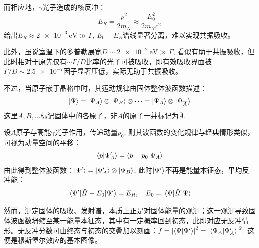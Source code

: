 \documentclass[aps,pre,12pt,preprint,%
	onecolumn,showpacs,showkeys,nofootinbib]{revtex4-1}
\begin{document}
	而相应地，$\gamma$光子造成的核反冲：
	\begin{equation}
		E_R = \frac{p^2}{2m_N} \approx \frac{E_0^2}{2m_N c^2}
	\end{equation}
	给出$E_R \approx \SI{2e-3}{\eV} \gg \Gamma$, $E_0 \pm E_R$谱线显著分离，难以实现共振吸收。
\clearpage
	
	此外，虽说室温下的多普勒展宽$D\sim\SI{2e-2}{\eV} \gg \Gamma$, 看似有助于共振吸收，但此时相对于原先仅有$\sim\Gamma/D$比率的光子可被吸收，即有效吸收界面被$\Gamma/D\sim\num{2.5e-7}$因子显著压低，实际无助于共振吸收。
	
	\newparagraph
	不过，当原子嵌于晶格中时，其运动规律由固体整体波函数描述：
	\begin{equation}
		\ket{\Psi}
		= \ket{\Psi_A} \otimes \ket{\Psi_B}
			\otimes \cdots
		= \ket{\Psi_A} \otimes \ket{\Psi_{\overline{A}}}
	\end{equation}
	这里$A,B,\dots$标记固体中的各原子，非$A$的原子一并标记为$\overline{A}$. 
	
	设$A$原子与高能$\gamma$光子作用，传递动量$p_0$, 则其波函数的变化规律与经典情形类似，可视为动量空间的平移：
	\begin{equation}
		\braket{p}{\Psi'_A} = \braket{p-p_0}{\Psi_A}
	\end{equation}
	由此得到整体波函数：$\ket{\Psi'} = \ket{\Psi'_A}\otimes\ket{\Psi_B}$, 此时$\ket{\Psi'}$不再是能量本征态，平均反冲能：
	\begin{equation}
		\mel{\Psi'}{\hat{H} - E_0}{\Psi'}
		= E_R,\quad
		E_0 = \mel{\Psi}{\hat{H}}{\Psi}
	\end{equation}
	
	然而，测定固体的吸收、发射谱，本质上正是对固体能量的观测；这一观测导致固体波函数坍缩至某一能量本征态，其中有一定概率回到初态，此即对应无反冲情形。无反冲分数可由终态与初态的交叠加以刻画：$f = \abs{\braket{\Psi}{\Psi'}}^2 = \abs{\braket{\Psi_A}{\Psi'_A}}^2$. 这便是穆斯堡尔效应的基本图像。
\restorejot
\pagebreak
\end{document}
